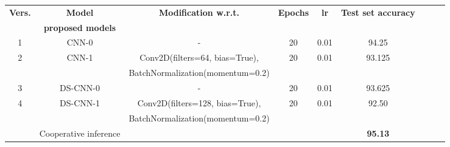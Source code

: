 \documentclass{article}
\begin{document}
\vspace{0.2cm}

\begin{center}
\begin{tabular}{ |c|c|c|c|c|c|c|c|c| } 
\hline
\vspace{-0.09cm}

\textbf{Vers.} &\textbf{Model} &\textbf{Modification w.r.t.} &\textbf{Epochs}&\textbf{lr} &\textbf{Test set accuracy}\\
\textbf{} &\textbf{proposed models} &\textbf{}&\textbf{} &\textbf{}\\
\hline
1 & CNN-0 &-& 20 & 0.01 & 94.25\\
\hline
2 & CNN-1&Conv2D(filters=64, bias=True),&20&0.01&93.125\\
&&BatchNormalization(momentum=0.2)&&&\\
\hline
3 & DS-CNN-0&-&20&0.01&93.625\\
\hline
4 & DS-CNN-1&Conv2D(filters=128, bias=True),&20&0.01&92.50\\
&& BatchNormalization(momentum=0.2)&&&\\
\hline\hline
&Cooperative inference &&&&\textbf{95.13} \\
\hline
\end{tabular}

\end{center}
\end{document}
